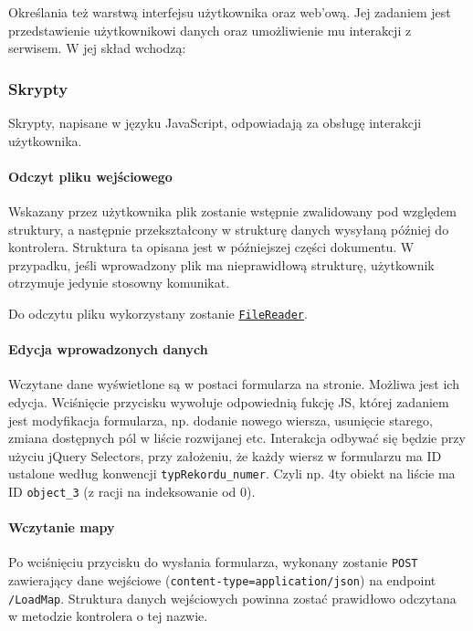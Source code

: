 \documentclass[a4paper, 10pt, titlepage]{article}
\newcommand{\code}[1]{\texttt{#1}}
\begin{document}
Określania też warstwą interfejsu użytkownika oraz web'ową.
Jej zadaniem jest przedstawienie użytkownikowi danych oraz umożliwienie mu interakcji z serwisem. W jej skład wchodzą:

\subsubsection{Skrypty}

Skrypty, napisane w języku JavaScript, odpowiadają za obsługę interakcji użytkownika.

\paragraph{Odczyt pliku wejściowego}

Wskazany przez użytkownika plik zostanie wstępnie zwalidowany pod względem struktury, a następnie przekształcony w strukturę danych wysyłaną później do kontrolera.
Struktura ta opisana jest w późniejszej części dokumentu.
W przypadku, jeśli wprowadzony plik ma nieprawidłową strukturę, użytkownik otrzymuje jedynie stosowny komunikat.

Do odczytu pliku wykorzystany zostanie \href{https://developer.mozilla.org/en-US/docs/Web/API/FileReader}{\code{FileReader}}.

\paragraph{Edycja wprowadzonych danych}

Wczytane dane wyświetlone są w postaci formularza na stronie.
Możliwa jest ich edycja.
Wciśnięcie przycisku wywołuje odpowiednią fukcję JS, której zadaniem jest modyfikacja formularza, np. dodanie nowego wiersza, usunięcie starego, zmiana dostępnych pól w liście rozwijanej etc.
Interakcja odbywać się będzie przy użyciu jQuery Selectors, przy założeniu, że każdy wiersz w formularzu ma ID ustalone według konwencji \code{typRekordu\_numer}.
Czyli np. 4ty obiekt na liście ma ID \code{object\_3} (z racji na indeksowanie od 0).

\paragraph{Wczytanie mapy}

Po wciśnięciu przycisku do wysłania formularza, wykonany zostanie \code{POST} zawierający dane wejściowe (\code{content-type=application/json}) na endpoint \code{/LoadMap}.
Struktura danych wejściowych powinna zostać prawidłowo odczytana w metodzie kontrolera o tej nazwie.
\end{document}
